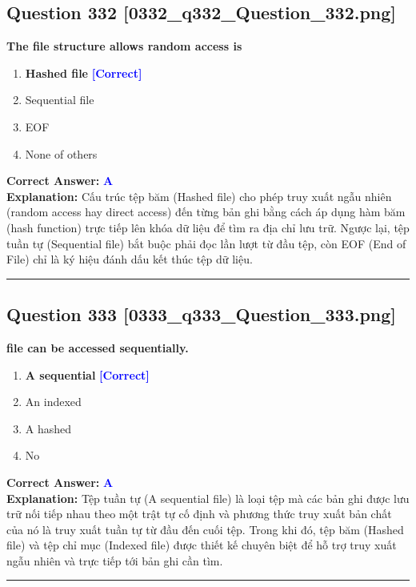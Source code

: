 \documentclass[11pt,a4paper]{article}
\begin{document}
\begin{minipage}{\textwidth}
\subsection*{Question 332 \quad \footnotesize{[0332\_q332\_Question\_332.png]}}
\noindent \textbf{The file structure allows random access is}

\begin{enumerate}[label=\Alph*.]
    \item \textbf{Hashed file} \hfill \textcolor{blue}{\textbf{[Correct]}}
    \item Sequential file
    \item EOF
    \item None of others
\end{enumerate}

\noindent \textbf{Correct Answer:} \textcolor{blue}{\textbf{A}} \\[2pt]
\noindent \textbf{Explanation:} Cấu trúc tệp băm (Hashed file) cho phép truy xuất ngẫu nhiên (random access hay direct access) đến từng bản ghi bằng cách áp dụng hàm băm (hash function) trực tiếp lên khóa dữ liệu để tìm ra địa chỉ lưu trữ. Ngược lại, tệp tuần tự (Sequential file) bắt buộc phải đọc lần lượt từ đầu tệp, còn EOF (End of File) chỉ là ký hiệu đánh dấu kết thúc tệp dữ liệu.

\par\vspace{0.3cm}
\hrule
\vspace{0.3cm}
\end{minipage}

\begin{minipage}{\textwidth}
\subsection*{Question 333 \quad \footnotesize{[0333\_q333\_Question\_333.png]}}
\noindent \textbf{file can be accessed sequentially.}

\begin{enumerate}[label=\Alph*.]
    \item \textbf{A sequential} \hfill \textcolor{blue}{\textbf{[Correct]}}
    \item An indexed
    \item A hashed
    \item No
\end{enumerate}

\noindent \textbf{Correct Answer:} \textcolor{blue}{\textbf{A}} \\[2pt]
\noindent \textbf{Explanation:} Tệp tuần tự (A sequential file) là loại tệp mà các bản ghi được lưu trữ nối tiếp nhau theo một trật tự cố định và phương thức truy xuất bản chất của nó là truy xuất tuần tự từ đầu đến cuối tệp. Trong khi đó, tệp băm (Hashed file) và tệp chỉ mục (Indexed file) được thiết kế chuyên biệt để hỗ trợ truy xuất ngẫu nhiên và trực tiếp tới bản ghi cần tìm.

\par\vspace{0.3cm}
\hrule
\vspace{0.3cm}
\end{minipage}
\end{document}
